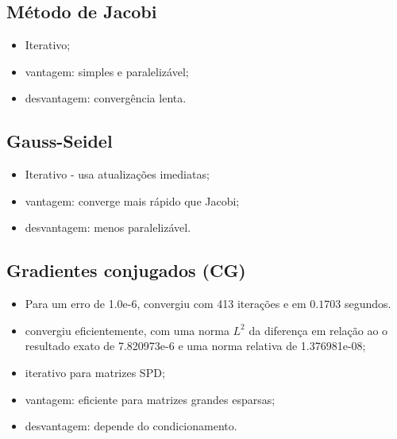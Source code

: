 \documentclass{article} %
\theoremstyle{definition}
\begin{document}
        \subsection*{Método de Jacobi}
            \begin{itemize}
                \item Iterativo;
                \item vantagem: simples e paralelizável;
                \item desvantagem: convergência lenta.
            \end{itemize}
        \subsection*{Gauss-Seidel}
            \begin{itemize}
                \item Iterativo - usa atualizações imediatas;
                \item vantagem: converge mais rápido que Jacobi;
                \item desvantagem: menos paralelizável.
            \end{itemize}

        \subsection*{Gradientes conjugados (CG)}

            \begin{itemize}
                \item Para um erro de 1.0e-6, convergiu com 413 iterações e em $0.1703$ segundos.
                \item convergiu eficientemente, com uma norma $L^2$ da diferença em relação ao
                    o resultado exato de 7.820973e-6 e uma norma relativa de 1.376981e-08;
                \item iterativo para matrizes SPD;
                \item vantagem: eficiente para matrizes grandes esparsas;
                \item desvantagem: depende do condicionamento.
            \end{itemize}
\end{document}

